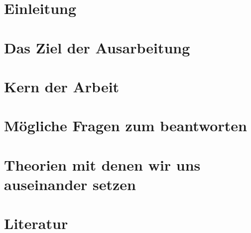 \documentclass[12pt]{article}
\begin{document}
    
    \newpage

    \tableofcontents
    \newpage

    \section{Einleitung}
        
    
    \section{Das Ziel der Ausarbeitung} 
        

    \section{Kern der Arbeit}
            

    \newpage    
    
    \section{Mögliche Fragen zum beantworten}
        
    
    \section{Theorien mit denen wir uns auseinander setzen}
        
            
    \newpage
    
    \section{Literatur}
    	\printbibliography
    	
    \newpage
    \cite{}
\end{document}
